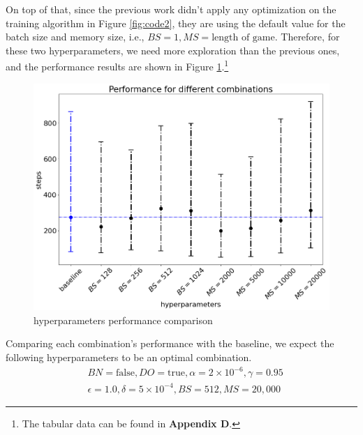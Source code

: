 \documentclass[letterpaper]{article} %
\begin{document}
\begin{itemize}
  On top of that, since the previous work didn't apply any optimization on the training algorithm in Figure \ref{fig:code2}, they are using the default value for the batch size and memory size, i.e., $BS=1, MS=\text{length of game}$. Therefore, for these two hyperparameters, we need more exploration than the previous ones, and the performance results are shown in Figure \ref{fig:hp2}.\footnote{The tabular data can be found in \textbf{Appendix D}.} 

  \begin{figure}[h!]
    \centering
    \includegraphics[width=0.9\linewidth]{figures/HP2}
    \caption{hyperparameters performance comparison}
    \label{fig:hp2}
  \end{figure}

  Comparing each combination's performance with the baseline, we expect the following hyperparameters to be an optimal combination.
  \begin{align*}
    &BN=\text{false}, DO=\text{true}, \alpha=2\times 10^{-6}, \gamma = 0.95\\
    &\epsilon=1.0,\delta=5\times 10^{-4}, BS=512, MS=20,000
  \end{align*}


\end{itemize}
\end{document}
